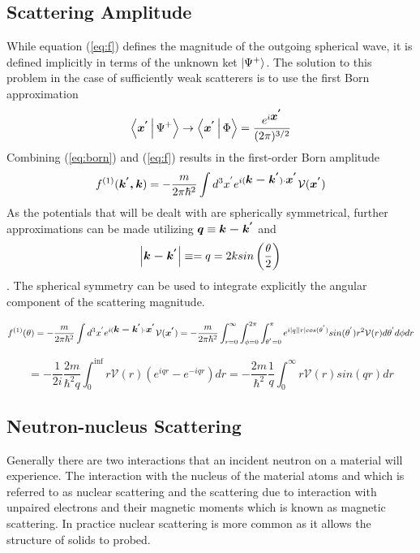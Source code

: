 \subsection{Scattering Amplitude}
While equation (\ref{eq:f}) defines the magnitude of the outgoing spherical wave, it is defined implicitly in terms of the unknown ket $\Ket{\Psi^{+}}$. The solution to this problem in the case of sufficiently weak scatterers is to use the first Born approximation 
\begin{equation}
\label{eq:born}
\Braket{\mbox{\boldmath$x^{'}$}|\Psi^{+}} \rightarrow \Braket{\mbox{\boldmath$x^{'}$}| \Phi} = \frac{e^{i\mbox{\boldmath$x^{'}$}}}{(2\pi)^{3/2}}
\end{equation}
Combining (\ref{eq:born}) and (\ref{eq:f}) results in the first-order Born amplitude 
\begin{equation}
\label{eq:firstOrderBorn}
f^{(1)}(\mbox{\boldmath$k^{'},k$}) = -\frac{m}{2\pi\hbar^2}\int d^3x^{'}e^{i(\mbox{\boldmath$k-k^{'}$})\cdot \mbox{\boldmath$x^{'}$}}\mathcal{V}(\mbox{\boldmath$x^{'}$})
\end{equation}
As the potentials that will be dealt with are spherically symmetrical, further approximations can be made utilizing $\mbox{\boldmath$q$} \equiv \mbox{\boldmath$k-k^{'}$}$ and $$\left|\mbox{\boldmath$k-k^{'}$}\right| \equiv = q = 2ksin \left( \frac{\theta}{2}\right)$$. The spherical symmetry can be used to integrate explicitly the angular component of the scattering magnitude. 

\begin{equation*}
f^{(1)}(\theta) = -\frac{m}{2\pi\hbar^2} \int d^3x^{'}e^{i(\mbox{\boldmath$k-k^{'}$})\cdot \mbox{\boldmath$x^{'}$}}\mathcal{V}(\mbox{\boldmath$x^{'}$})= -\frac{m}{2\pi\hbar^2} \int_{r=0}^{\infty} \int_{\phi=0}^{2\pi} \int_{\theta^{'}=0}^{\pi} e^{i \left|q\right|\left|r\right|cos(\theta^{'})}sin(\theta^{'})r^2 \mathcal{V}(r)d\theta^{'}d\phi dr

\end{equation*}

\begin{equation}
\label{eq:bornAngular}
= -\frac{1}{2i}\frac{2m}{\hbar^2q} \int_0^\inf r\mathcal{V}(r)(e^{iqr}-e^{-iqr})dr = -\frac{2m}{\hbar^2}\frac{1}{q}\int_0^\infty r\mathcal{V}(r)sin(qr)dr
\end{equation}

\subsection{Neutron-nucleus Scattering}
Generally there are two interactions that an incident neutron on a material will experience. The interaction with the nucleus of the material atoms and which is referred to as nuclear scattering and the scattering due to interaction with unpaired electrons and their magnetic moments which is known as magnetic scattering. In practice nuclear scattering is more common as it allows the structure of solids to probed. 

